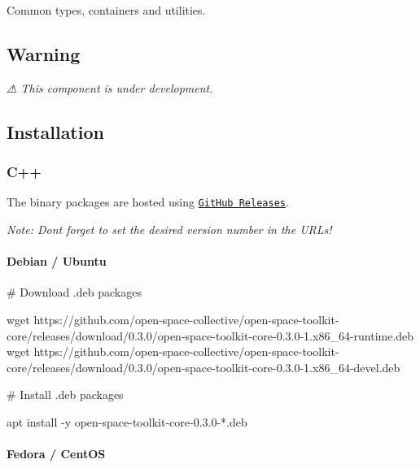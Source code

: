 \href{https://travis-ci.com/open-space-collective/open-space-toolkit-core}{\tt } \href{https://codecov.io/gh/open-space-collective/open-space-toolkit-core}{\tt } \href{https://open-space-collective.github.io/open-space-toolkit-core}{\tt } \href{https://badge.fury.io/gh/open-space-collective%2Fopen-space-toolkit-core}{\tt } \href{https://badge.fury.io/py/open-space-toolkit-core}{\tt } \href{https://opensource.org/licenses/Apache-2.0}{\tt }

Common types, containers and utilities.

\subsection*{Warning}

{\itshape ⚠ This component is under development.}

\subsection*{Installation}

\subsubsection*{C++}

The binary packages are hosted using \href{https://github.com/open-space-collective/open-space-toolkit-core/releases}{\tt Git\+Hub Releases}.

{\itshape Note\+: Don\textquotesingle{}t forget to set the desired version number in the U\+R\+Ls!}

\paragraph*{Debian / Ubuntu}


\begin{DoxyCode}
# Download .deb packages

wget
       https://github.com/open-space-collective/open-space-toolkit-core/releases/download/0.3.0/open-space-toolkit-core-0.3.0-1.x86\_64-runtime.deb
wget
       https://github.com/open-space-collective/open-space-toolkit-core/releases/download/0.3.0/open-space-toolkit-core-0.3.0-1.x86\_64-devel.deb

# Install .deb packages

apt install -y open-space-toolkit-core-0.3.0-*.deb
\end{DoxyCode}


\paragraph*{Fedora / Cent\+OS}


